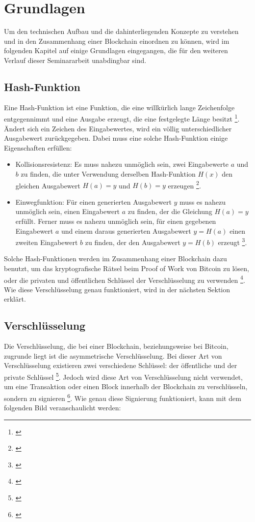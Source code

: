 \chapter{Grundlagen}

Um den technischen Aufbau und die dahinterliegenden Konzepte zu verstehen und in den Zusammenhang einer Blockchain einordnen zu können, wird im folgenden Kapitel auf einige Grundlagen eingegangen, die für den weiteren Verlauf dieser Seminararbeit unabdingbar sind.

\section{Hash-Funktion}\label{sec:hash-funktion}
Eine Hash-Funktion ist eine Funktion, die eine willkürlich lange Zeichenfolge entgegennimmt und eine Ausgabe erzeugt, die eine festgelegte Länge besitzt \footnote{\parencite[vgl.][S. 159f]{Damgard.1999}}. Ändert sich ein Zeichen des Eingabewertes, wird ein völlig unterschiedlicher Ausgabewert zurückgegeben. Dabei muss eine solche Hash-Funktion einige Eigenschaften erfüllen:

\begin{itemize}
    \item Kollisionsresistenz: Es muss nahezu unmöglich sein, zwei Eingabewerte $a$ und $b$ zu finden, die unter Verwendung derselben Hash-Funktion $H(x)$ den gleichen Ausgabewert $H(a) = y$ und $H(b) = y$ erzeugen \footnote{\parencite[vgl.][S. 3]{Raikwar.2019}}.
    \item Einwegfunktion: Für einen generierten Ausgabewert $y$ muss es nahezu unmöglich sein, einen Eingabewert $a$ zu finden, der die Gleichung $H(a) = y$ erfüllt. Ferner muss es nahezu unmöglich sein, für einen gegebenen Eingabewert $a$ und einem daraus generierten Ausgabewert $y = H(a)$ einen zweiten Eingabewert $b$ zu finden, der den Ausgabewert $y = H(b)$ erzeugt \footnote{\parencite[vgl.][S. 3]{Raikwar.2019}}.
\end{itemize}

Solche Hash-Funktionen werden im Zusammenhang einer Blockchain dazu benutzt, um das kryptografische Rätsel beim Proof of Work von Bitcoin zu lösen, oder die privaten und öffentlichen Schlüssel der Verschlüsselung zu verwenden \footnote{\parencite[vgl.][S. 4]{Raikwar.2019}}. Wie diese Verschlüsselung genau funktioniert, wird in der nächsten Sektion erklärt.

\section{Verschlüsselung}\label{sec:verschluesselung}
Die Verschlüsselung, die bei einer Blockchain, beziehungsweise bei Bitcoin, zugrunde liegt ist die asymmetrische Verschlüsselung. Bei dieser Art von Verschlüsselung existieren zwei verschiedene Schlüssel: der öffentliche und der private Schlüssel \footnote{\parencite[vgl.]{entwickler.de.NaN}}. Jedoch wird diese Art von Verschlüsselung nicht verwendet, um eine Transaktion oder einen Block innerhalb der Blockchain zu verschlüsseln, sondern zu signieren \footnote{\parencite[vgl.][S. 11]{Raikwar.2019}}. Wie genau diese Signierung funktioniert, kann mit dem folgenden Bild veranschaulicht werden:

